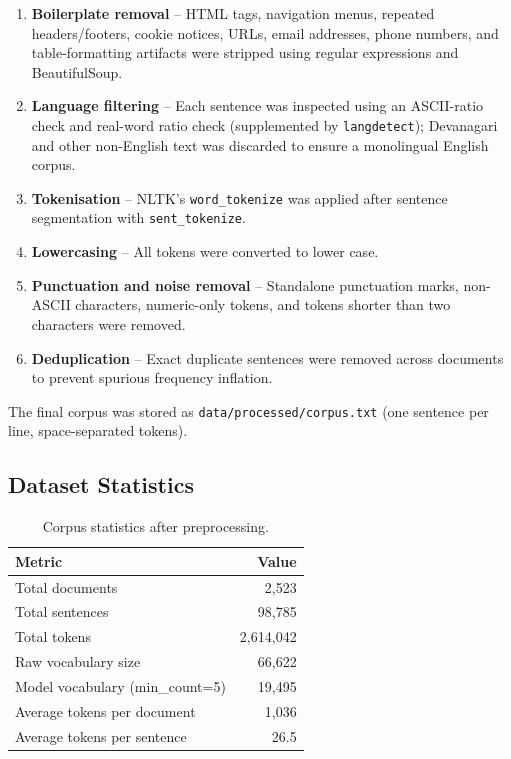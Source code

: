 \documentclass[12pt,a4paper]{article}
\begin{document}
\begin{enumerate}[leftmargin=1.4em]
    \item \textbf{Boilerplate removal} -- HTML tags, navigation menus,
          repeated headers/footers, cookie notices, URLs, email addresses,
          phone numbers, and table-formatting artifacts were stripped using
          regular expressions and BeautifulSoup.

    \item \textbf{Language filtering} -- Each sentence was inspected using
          an ASCII-ratio check and real-word ratio check (supplemented by
          \texttt{langdetect}); Devanagari and other non-English text was
          discarded to ensure a monolingual English corpus.

    \item \textbf{Tokenisation} -- NLTK's \texttt{word\_tokenize} was applied
          after sentence segmentation with \texttt{sent\_tokenize}.

    \item \textbf{Lowercasing} -- All tokens were converted to lower case.

    \item \textbf{Punctuation and noise removal} -- Standalone punctuation
          marks, non-ASCII characters, numeric-only tokens, and tokens shorter
          than two characters were removed.

    \item \textbf{Deduplication} -- Exact duplicate sentences were removed
          across documents to prevent spurious frequency inflation.
\end{enumerate}

The final corpus was stored as \texttt{data/processed/corpus.txt} (one
sentence per line, space-separated tokens).

\subsection{Dataset Statistics}

\begin{table}[H]
    \centering
    \caption{Corpus statistics after preprocessing.}
    \label{tab:stats}
    \begin{tabular}{lr}
        \toprule
        \textbf{Metric} & \textbf{Value} \\
        \midrule
        Total documents                & 2{,}523 \\
        Total sentences                & 98{,}785 \\
        Total tokens                   & 2{,}614{,}042 \\
        Raw vocabulary size            & 66{,}622 \\
        Model vocabulary (min\_count=5) & 19{,}495 \\
        Average tokens per document    & 1{,}036 \\
        Average tokens per sentence    & 26.5 \\
        \bottomrule
    \end{tabular}
\end{table}
\end{document}
